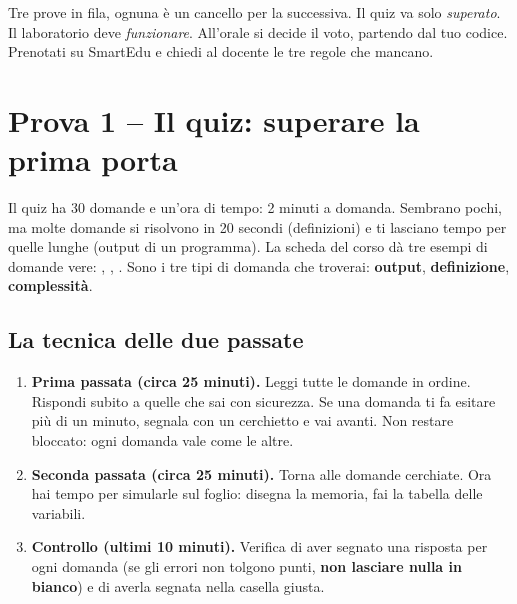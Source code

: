 \begin{inparole}
Tre prove in fila, ognuna è un cancello per la successiva. Il quiz va solo
\emph{superato}. Il laboratorio deve \emph{funzionare}. All'orale si decide il voto,
partendo dal tuo codice. Prenotati su SmartEdu e chiedi al docente le tre regole che
mancano.
\end{inparole}

\section{Prova 1 -- Il quiz: superare la prima porta}

Il quiz ha 30 domande e un'ora di tempo: 2 minuti a domanda. Sembrano pochi, ma molte
domande si risolvono in 20 secondi (definizioni) e ti lasciano tempo per quelle lunghe
(output di un programma). La scheda del corso dà tre esempi di domande vere:
, , . Sono i tre tipi di domanda che
troverai: \textbf{output}, \textbf{definizione}, \textbf{complessità}.

\subsection*{La tecnica delle due passate}

\begin{passopasso}
\begin{enumerate}
  \item \textbf{Prima passata (circa 25 minuti).} Leggi tutte le domande in ordine.
        Rispondi subito a quelle che sai con sicurezza. Se una domanda ti fa esitare
        più di un minuto, segnala con un cerchietto e vai avanti. Non restare bloccato:
        ogni domanda vale come le altre.
  \item \textbf{Seconda passata (circa 25 minuti).} Torna alle domande cerchiate. Ora
        hai tempo per simularle sul foglio: disegna la memoria, fai la tabella delle
        variabili.
  \item \textbf{Controllo (ultimi 10 minuti).} Verifica di aver segnato una risposta per
        ogni domanda (se gli errori non tolgono punti, \textbf{non lasciare nulla in
        bianco}) e di averla segnata nella casella giusta.
\end{enumerate}
\end{passopasso}

